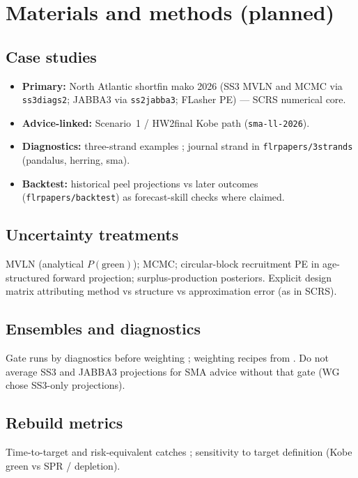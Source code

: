 \documentclass[11pt,a4paper]{article}
\newcommand{\PG}{P(\mathrm{green})}
\begin{document}
\section{Materials and methods (planned)}

\subsection{Case studies}
\begin{itemize}[leftmargin=*]
  \item \textbf{Primary:} North Atlantic shortfin mako 2026 (SS3 MVLN and
    MCMC via \texttt{ss3diags2}; JABBA3 via \texttt{ss2jabba3}; FLasher PE)
    --- SCRS numerical core.
  \item \textbf{Advice-linked:} Scenario~1 / HW2final Kobe path
    (\texttt{sma-ll-2026}).
  \item \textbf{Diagnostics:} three-strand examples
    \citep{Kell2026Diags}; journal strand in \texttt{flrpapers/3strands}
    (pandalus, herring, sma).
  \item \textbf{Backtest:} historical peel projections vs later outcomes
    (\texttt{flrpapers/backtest}) as forecast-skill checks where claimed.
\end{itemize}

\subsection{Uncertainty treatments}
MVLN (analytical $\PG$); MCMC; circular-block recruitment PE in age-structured
forward projection; surplus-production posteriors. Explicit design matrix
attributing method vs structure vs approximation error (as in SCRS).

\subsection{Ensembles and diagnostics}
Gate runs by diagnostics before weighting \citep{Kell2026Diags,Carvalho2021};
weighting recipes from \citet{WangEnsembleR5}. Do not average SS3 and JABBA3
projections for SMA advice without that gate (WG chose SS3-only projections).

\subsection{Rebuild metrics}
Time-to-target and risk-equivalent catches \citep{KellAcceptedFaF}; sensitivity
to target definition (Kobe green vs SPR / depletion).
\end{document}
